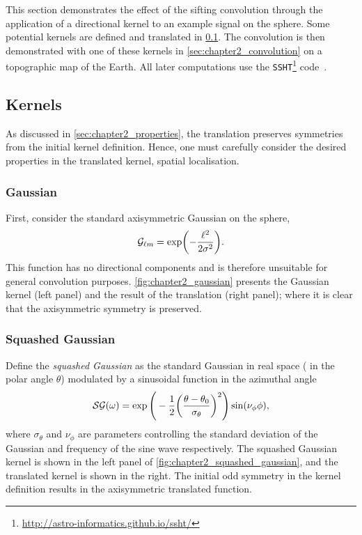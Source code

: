 This section demonstrates the effect of the sifting convolution through the application of a directional kernel to an example signal on the sphere.
Some potential kernels are defined and translated in \cref{sec:chapter2_kernels}.
The convolution is then demonstrated with one of these kernels in \cref{sec:chapter2_convolution} on a topographic map of the Earth.
All later computations use the \texttt{SSHT}\footnote{\url{http://astro-informatics.github.io/ssht/}} code~\cite{McEwen2011}.

\subsection{Kernels}\label{sec:chapter2_kernels}

As discussed in \cref{sec:chapter2_properties}, the translation preserves symmetries from the initial kernel definition.
Hence, one must carefully consider the desired properties in the translated kernel, \eg{} spatial localisation.

\subsubsection{Gaussian}

First, consider the standard axisymmetric Gaussian on the sphere, \ie{}
%
\begin{equation}
	{\mathcal{G}}_{\ell m}
	= \exp(-\frac{{\ell}^{2}}{2\sigma^{2}}).
\end{equation}
%
This function has no directional components and is therefore unsuitable for general convolution purposes.
\cref{fig:chapter2_gaussian} presents the Gaussian kernel (left panel) and the result of the translation (right panel); where it is clear that the axisymmetric symmetry is preserved.



\subsubsection{Squashed Gaussian}

Define the \emph{squashed Gaussian} as the standard Gaussian in real space (\ie{} in the polar angle \(\theta{}\)) modulated by a sinusoidal function in the azimuthal angle
%
\begin{equation}
	\mathcal{SG}(\omega)
	= \exp\Bigg(-\frac{1}{2}{\bigg(\frac{\theta-\theta_{0}}{\sigma_{\theta}}\bigg)}^{2}\Bigg)
	\sin(\nu_{\phi}\phi),
\end{equation}
%
where \(\sigma_{\theta}\) and \(\nu_{\phi}\) are parameters controlling the standard deviation of the Gaussian and frequency of the sine wave respectively.
The squashed Gaussian kernel is shown in the left panel of \cref{fig:chapter2_squashed_gaussian}, and the translated kernel is shown in the right.
The initial odd symmetry in the kernel definition results in the axisymmetric translated function.

